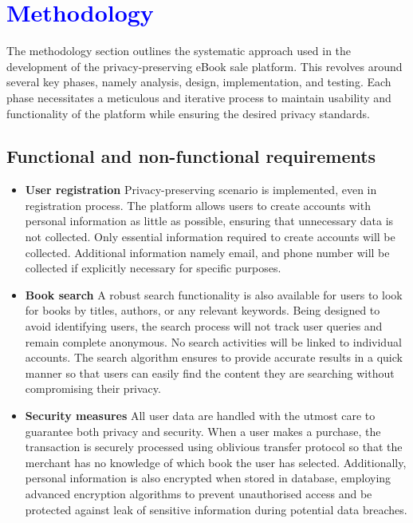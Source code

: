 \documentclass[12pt]{article}
\newcommand{\tb}{\textcolor{blue}}
\begin{document}
\pagebreak
\section{\tb{Methodology}}
The methodology section outlines the systematic approach used in the development of the privacy-preserving eBook sale platform. This revolves around several key phases, namely analysis, design, implementation, and testing. Each phase necessitates a meticulous and iterative process to maintain usability and functionality of the platform while ensuring the desired privacy standards.
\subsection{Functional and non-functional requirements}
\begin{itemize}
	\item \textbf{User registration}
	Privacy-preserving scenario is implemented, even in registration process. The platform allows users to create accounts with personal information as little as possible, ensuring that unnecessary data is not collected. Only essential information required to create accounts will be collected. Additional information namely email, and phone number will be collected if explicitly necessary for specific purposes.
	\item \textbf{Book search}
A robust search functionality is also available for users to look for books by titles, authors, or any relevant keywords. Being designed to avoid identifying users, the search process will not track user queries and remain complete anonymous. No search activities will be linked to individual accounts. The search algorithm ensures to provide accurate results in a quick manner so that users can easily find the content they are searching without compromising their privacy.
	\item \textbf{Security measures}
All user data are handled with the utmost care to guarantee both privacy and security. When a user makes a purchase, the transaction is securely processed using oblivious transfer protocol so that the merchant has no knowledge of which book the user has selected. Additionally, personal information is also encrypted when stored in database, employing advanced encryption algorithms to prevent unauthorised access and be protected against leak of sensitive information during potential data breaches.
	

\end{itemize}
\end{document}
